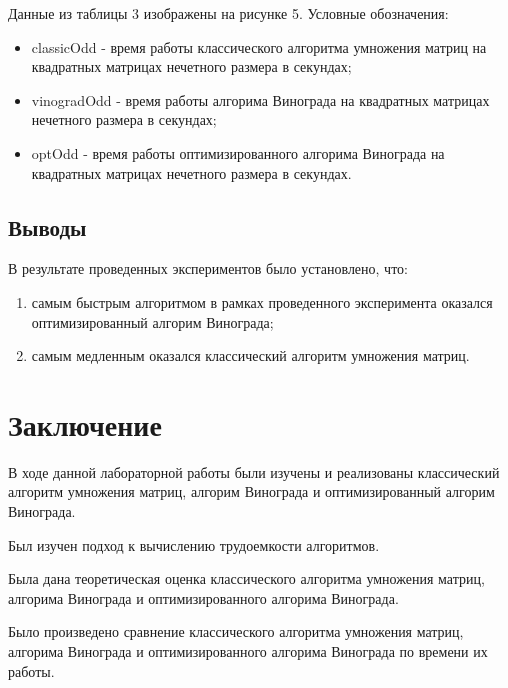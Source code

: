 \documentclass[a4paper,14pt]{report}
\begin{document}
\newpage
Данные из таблицы 3 изображены на рисунке 5. Условные обозначения:

\begin{itemize}
	\item classicOdd - время работы классического алгоритма умножения матриц на квадратных матрицах нечетного размера в секундах;
		\item vinogradOdd - время работы алгорима Винограда на квадратных матрицах нечетного размера в секундах;
			\item optOdd - время работы оптимизированного алгорима Винограда на квадратных матрицах нечетного размера в секундах.
\end{itemize}

\begin{figure}[!h]
\end{figure}


\section*{Выводы}

В результате проведенных экспериментов было установлено, что:

\begin{enumerate}
	\item самым быстрым алгоритмом в рамках проведенного эксперимента оказался оптимизированный алгорим Винограда;
	\item самым медленным оказался классический алгоритм умножения матриц.
\end{enumerate}


\chapter*{Заключение}

В ходе данной лабораторной работы были изучены и реализованы классический алгоритм умножения матриц, алгорим Винограда и оптимизированный алгорим Винограда.

Был изучен подход к вычислению трудоемкости алгоритмов.

Была дана теоретическая оценка классического алгоритма умножения матриц, алгорима Винограда и оптимизированного алгорима Винограда.

Было произведено сравнение классического алгоритма умножения матриц, алгорима Винограда и оптимизированного алгорима Винограда по времени их работы.
\end{document}
